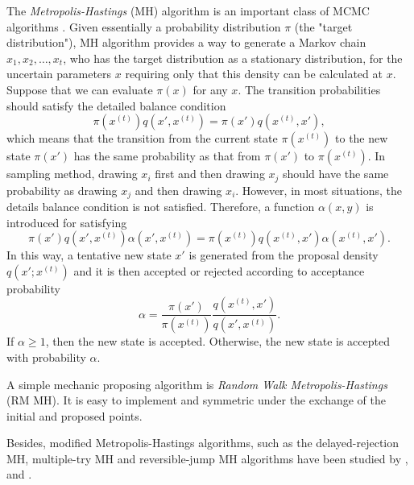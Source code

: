 The \textit{Metropolis-Hastings} (MH) algorithm is an important class of MCMC algorithms \cite{smith1993bayesian} \cite{tierney1994markov} \cite{gilks1995markov}. Given essentially a probability distribution $\pi$ (the "target distribution"), MH algorithm provides a way to generate a Markov chain $x_1, x_2,\ldots, x_t$, who has the target distribution as a stationary distribution, for the uncertain parameters $x$ requiring only that this density can be calculated at $x$. Suppose that we can evaluate $\pi(x)$ for any $x$. The transition probabilities should satisfy the detailed balance condition
\begin{equation*}
\pi\left(x^{(t)}\right)q\left(x', x^{(t)}\right) = \pi\left(x'\right)q\left(x^{(t)}, x'\right),
\end{equation*}
which means that the transition from the current state $\pi\left(x^{\left(t\right)}\right)$ to the new state $\pi\left(x'\right)$ has the same probability as that 
from $\pi\left(x'\right)$ to $\pi\left(x^{\left(t\right)}\right)$. In sampling method, drawing $x_i$ first and then drawing $x_j$ should have the same probability as drawing $x_j$ and then drawing $x_i$. However, in most situations, the details balance condition is not satisfied. Therefore, a function $\alpha\left(x,y\right)$ is introduced for satisfying 
\begin{equation*}
\pi\left(x'\right)q\left(x', x^{\left(t\right)}\right)\alpha\left(x',x^{\left(t\right)}\right) = \pi\left(x^{\left(t\right)}\right)q\left(x^{\left(t\right)}, x'\right)\alpha\left(x^{\left(t\right)},x'\right).
\end{equation*}
In this way, a tentative new state $x'$ is generated from the proposal density $q\left(x';x^{\left(t\right)}\right)$ and it is then accepted or rejected according to acceptance probability 
\begin{equation}\label{IntroAccp}
\alpha=\frac{\pi\left(x'\right)}{\pi\left(x^{\left(t\right)}\right)}\frac{q\left(x^{\left(t\right)}, x'\right)}{q\left(x', x^{\left(t\right)}\right)}.
\end{equation}
If $\alpha \geq 1$, then the new state is accepted. Otherwise, the new state is accepted with probability $\alpha$.

A simple mechanic proposing algorithm is \textit{Random Walk Metropolis-Hastings} (RM MH). It is easy to implement and symmetric under the exchange of the initial and proposed points. 

Besides, modified Metropolis-Hastings algorithms, such as the delayed-rejection MH, multiple-try MH and reversible-jump MH algorithms have been studied by \cite{tierney1999some}, \cite{liu2000multiple} and \cite{green1995reversible}. 
 

